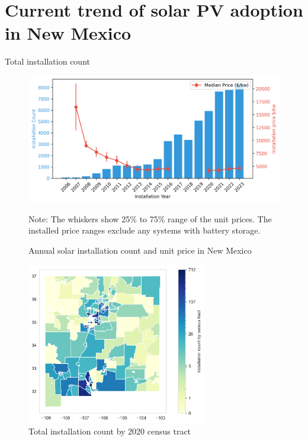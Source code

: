\documentclass[12pt,twoside,letterpaper]{article}
\begin{document}
\newpage
\section[Current trend]{Current trend of solar PV adoption in New Mexico}

Total installation count

\begin{figure}[H]
    \centering
\includegraphics[width=1\textwidth]{figures/installation_count_price.png}
    \caption{Annual solar installation count and unit price in New Mexico}
    \label{fig:installation_count}
    \begin{flushleft}
        \footnotesize Note: The whiskers show 25\% to 75\% range of the unit prices. The installed price ranges exclude any systems with battery storage.
    \end{flushleft}
    
\end{figure}

\begin{figure}[!ht]
    \centering
\includegraphics[width=0.7\textwidth]{figures/tract_count_map.png}
    \caption{Total installation count by 2020 census tract}
    \label{fig:tract_map}
    
\end{figure}
\end{document}
